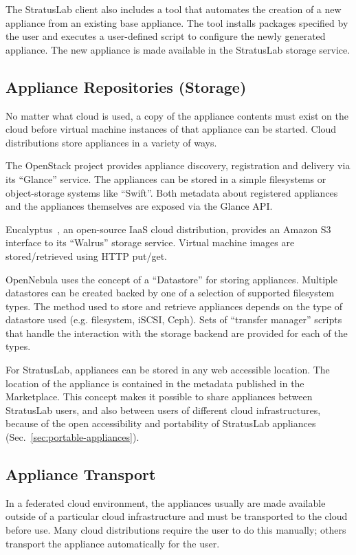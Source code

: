 The StratusLab client also includes a tool that automates the creation
of a new appliance from an existing base appliance.  The tool installs
packages specified by the user and executes a user-defined script to
configure the newly generated appliance. The new appliance is made
available in the StratusLab storage service.

\subsection{Appliance Repositories (Storage)}

No matter what cloud is used, a copy of the appliance contents must
exist on the cloud before virtual machine instances of that appliance
can be started.  Cloud distributions store appliances in a variety of
ways.

The OpenStack project provides appliance discovery, registration and
delivery via its ``Glance'' service. The appliances can be stored in a
simple filesystems or object-storage systems like ``Swift''\@. Both
metadata about registered appliances and the appliances themselves are
exposed via the Glance API\@.

Eucalyptus~\cite{eucalyptus}, an open-source IaaS cloud distribution,
provides an Amazon S3 interface to its ``Walrus'' storage
service. Virtual machine images are stored/retrieved using HTTP
put/get.

OpenNebula uses the concept of a ``Datastore'' for storing appliances.
Multiple datastores can be created backed by one of a selection of
supported filesystem types.  The method used to store and retrieve
appliances depends on the type of datastore used (e.g. filesystem,
iSCSI, Ceph). Sets of ``transfer manager'' scripts that handle the
interaction with the storage backend are provided for each of the
types.

For StratusLab, appliances can be stored in any web accessible
location. The location of the appliance is contained in the metadata
published in the Marketplace\@. This concept makes it possible to
share appliances between StratusLab users, and also between users of
different cloud infrastructures, because of the open accessibility and
portability of StratusLab appliances
(Sec.~\ref{sec:portable-appliances}).

\subsection{Appliance Transport}

In a federated cloud environment, the appliances usually are made
available outside of a particular cloud infrastructure and must be
transported to the cloud before use.  Many cloud distributions require
the user to do this manually; others transport the appliance
automatically for the user.

